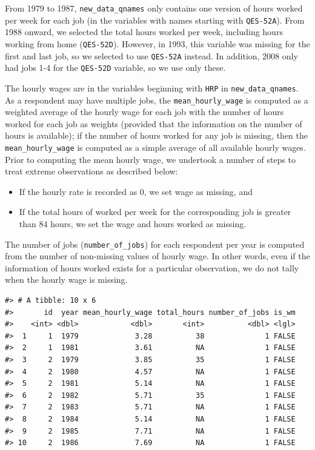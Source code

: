 \documentclass{article}
\providecommand{\tightlist}{%
  \setlength{\itemsep}{0pt}\setlength{\parskip}{0pt}}
\begin{document}
From 1979 to 1987, \texttt{new\_data\_qnames} only contains one version of hours worked per week for each job (in the variables with names starting with \texttt{QES-52A}). From 1988 onward, we selected the total hours worked per week, including hours working from home (\texttt{QES-52D}). However, in 1993, this variable was missing for the first and last job, so we selected to use \texttt{QES-52A} instead. In addition, 2008 only had jobs 1-4 for the \texttt{QES-52D} variable, so we use only these.

The hourly wages are in the variables beginning with \texttt{HRP} in \texttt{new\_data\_qnames}. As a respondent may have multiple jobs, the \texttt{mean\_hourly\_wage} is computed as a weighted average of the hourly wage for each job with the number of hours worked for each job as weights (provided that the information on the number of hours is available); if the number of hours worked for any job is missing, then the \texttt{mean\_hourly\_wage} is computed as a simple average of all available hourly wages. Prior to computing the mean hourly wage, we undertook a number of steps to treat extreme observations as described below:

\begin{itemize}
\tightlist
\item
  If the hourly rate is recorded as 0, we set wage as missing, and
\item
  If the total hours of worked per week for the corresponding job is greater than 84 hours, we set the wage and hours worked as missing.
\end{itemize}

The number of jobs (\texttt{number\_of\_jobs}) for each respondent per year is computed from the number of non-missing values of hourly wage. In other words, even if the information of hours worked exists for a particular observation, we do not tally when the hourly wage is missing.

\begin{verbatim}
#> # A tibble: 10 x 6
#>       id  year mean_hourly_wage total_hours number_of_jobs is_wm
#>    <int> <dbl>            <dbl>       <int>          <dbl> <lgl>
#>  1     1  1979             3.28          38              1 FALSE
#>  2     1  1981             3.61          NA              1 FALSE
#>  3     2  1979             3.85          35              1 FALSE
#>  4     2  1980             4.57          NA              1 FALSE
#>  5     2  1981             5.14          NA              1 FALSE
#>  6     2  1982             5.71          35              1 FALSE
#>  7     2  1983             5.71          NA              1 FALSE
#>  8     2  1984             5.14          NA              1 FALSE
#>  9     2  1985             7.71          NA              1 FALSE
#> 10     2  1986             7.69          NA              1 FALSE
\end{verbatim}
\end{document}
